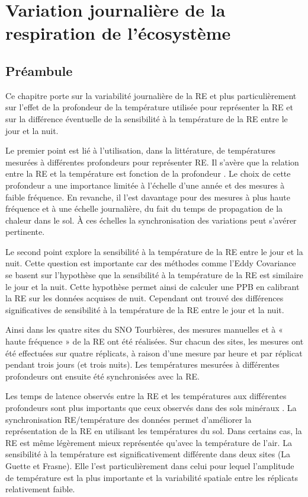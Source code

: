 \singlespacing
\chapter{Variation journalière de la respiration de l'écosystème}
\label{ch:ch5}

\minitoc

\newpage

\doublespacing
\section{Préambule}

Ce chapitre porte sur la variabilité journalière de la RE et plus particulièrement sur l'effet de la profondeur de la température utilisée pour représenter la RE et sur la différence éventuelle de la sensibilité à la température de la RE entre le jour et la nuit.

Le premier point est lié à l'utilisation, dans la littérature, de températures mesurées à différentes profondeurs pour représenter RE.
Il s'avère que la relation entre la RE et la température est fonction de la profondeur \citep{pavelka2007,graf2008}.
Le choix de cette profondeur a une importance limitée à l'échelle d'une année et des mesures à faible fréquence.
En revanche, il l'est davantage pour des mesures à plus haute fréquence et à une échelle journalière, du fait du temps de propagation de la chaleur dans le sol.
À ces échelles la synchronisation des variations peut s'avérer pertinente. 

Le second point explore la sensibilité à la température de la RE entre le jour et la nuit.
Cette question est importante car des méthodes comme l'Eddy Covariance se basent sur l'hypothèse que la sensibilité à la température de la RE est similaire le jour et la nuit.
Cette hypothèse permet ainsi de calculer une PPB en calibrant la RE sur les données acquises de nuit.
Cependant \citet{juszczak2012} ont trouvé des différences significatives de sensibilité à la température de la RE entre le jour et la nuit.

Ainsi dans les quatre sites du SNO Tourbières, des mesures manuelles et à « haute fréquence » de la RE ont été réalisées.
Sur chacun des sites, les mesures ont été effectuées sur quatre réplicats, à raison d'une mesure par heure et par réplicat pendant trois jours (et trois nuits).
Les températures mesurées à différentes profondeurs ont ensuite été synchronisées avec la RE.

Les temps de latence observés entre la RE et les températures aux différentes profondeurs sont plus importants que ceux observés dans des sols minéraux \citep{pavelka2007}.
La synchronisation RE/température des données permet d'améliorer la représentation de la RE en utilisant les températures du sol.
Dans certains cas, la RE est même légèrement mieux représentée qu'avec la température de l'air.
La sensibilité à la température est significativement différente dans deux sites (La Guette et Frasne).
Elle l'est particulièrement dans celui pour lequel l'amplitude de température est la plus importante et la variabilité spatiale entre les réplicats relativement faible.


